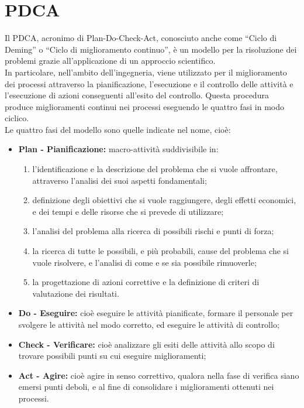 
\section{PDCA} \label{app:pdca}
Il PDCA, acronimo di Plan-Do-Check-Act, conosciuto anche come “Ciclo di Deming” o “Ciclo di miglioramento continuo”, è un modello per la risoluzione dei problemi grazie all'applicazione di un approccio scientifico.\\
In particolare, nell'ambito dell'ingegneria, viene utilizzato per il miglioramento dei processi attraverso la pianificazione, l'esecuzione e il controllo delle attività e l'esecuzione di azioni conseguenti all'esito del controllo. Questa procedura produce miglioramenti continui nei processi eseguendo le quattro fasi in modo ciclico.\\
Le quattro fasi del modello sono quelle indicate nel nome, cioè:
\begin{itemize}
	\item \textbf{Plan - Pianificazione:} macro-attività suddivisibile in:
		\begin{enumerate}
		\item l'identificazione e la descrizione del problema che si vuole affrontare, attraverso l'analisi dei suoi aspetti fondamentali;
		\item definizione degli obiettivi che si vuole raggiungere, degli effetti economici, e dei tempi e delle risorse che si prevede di utilizzare;
		\item l'analisi del problema alla ricerca di possibili rischi e punti di forza;
		\item la ricerca di tutte le possibili, e più probabili, cause del problema che si vuole risolvere, e l'analisi di come e se sia possibile rimuoverle;
		\item la progettazione di azioni correttive e la definizione di criteri di valutazione dei risultati.
		\end{enumerate}
	\item \textbf{Do - Eseguire:} cioè eseguire le attività pianificate, formare il personale per svolgere le attività nel modo corretto, ed eseguire le attività di controllo;
	\item \textbf{Check - Verificare:} cioè analizzare gli esiti delle attività allo scopo di trovare possibili punti su cui eseguire miglioramenti;
	\item \textbf{Act - Agire:} cioè agire in senso correttivo, qualora nella fase di verifica siano emersi punti deboli, e al fine di consolidare i miglioramenti ottenuti nei processi.
\end{itemize}

